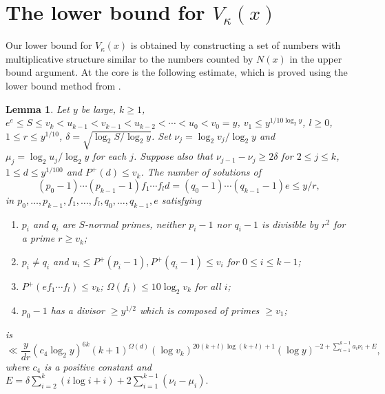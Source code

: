 \documentclass[11pt]{amsart}
\theoremstyle{remark}
\theoremstyle{plain}
\newtheorem{lem}{Lemma}[section]
\numberwithin{equation}{section}
\newcommand{\be}{\begin{equation}}
\newcommand{\ee}{\end{equation}}
\newcommand{\del}{\ensuremath{\delta}}
\renewcommand{\(}{\left(}
\renewcommand{\)}{\right)}
\renewcommand{\le}{\leqslant}
\renewcommand{\ge}{\geqslant}
\begin{document}
%
%
\section{The lower bound for $V_\kappa(x)$}
%
%
%




Our lower bound for $V_\kappa(x)$ is obtained by constructing a set of numbers
with multiplicative structure similar to the numbers counted by $N(x)$ in
the upper bound argument.  At the core is the following estimate, which
is proved using the lower bound method from \cite{MP}.

\begin{lem}\label{prodpiqi}
Let $y$ be large, $k\ge 1$, 
$e^e \le S \le v_k < u_{k-1} < v_{k-1} < 
u_{k-2} < \cdots < u_0 < v_0=y$, $v_1 \le y^{1/10\log_2 y}$, 
$l\ge 0$,  $1\le r\le y^{1/10}$,
$\del=\sqrt{\log_2 S/\log_2 y}$.  Set $\nu_j=\log_2 v_j/\log_2 y$ 
and $\mu_j=\log_2 u_j/\log_2 y$ for each $j$.
Suppose also that $\nu_{j-1}-\nu_j \ge 2\del$ for $2\le j\le k$,
$1\le d\le y^{1/100}$ and $P^+(d)\le v_k$.
The number of solutions of
\be\label{piqi}
(p_0-1)\cdots (p_{k-1}-1)f_1\cdots f_{l}d = (q_0-1)\cdots (q_{k-1}-1)e \le y/r,
\ee
in $p_0,\ldots,p_{k-1},f_1,\ldots,f_l,q_0,\ldots,q_{k-1},e$ satisfying
\begin{enumerate}
\item $p_i$ and $q_i$ are $S$-normal primes,
neither $p_i-1$ nor $q_i-1$ is divisible by $r^2$ for a prime $r\ge v_k$;
\item $p_i\ne q_i$ and $u_i\le P^+(p_i-1), P^+(q_i-1) \le v_i$ for 
$0\le i\le k-1$; %
\item $P^+(ef_1\cdots f_{l})\le v_k$; $\Omega(f_i)\le 10\log_2 v_k$ for all $i$; %
\item $p_0-1$ has a divisor $\ge y^{1/2}$ which is composed of primes $\ge v_1$;
\end{enumerate}
is
$$
\ll \frac{y}{dr} (c_4\log_2 y)^{6k} (k+1)^{\Omega(d)} 
(\log v_k)^{20(k+l)\log(k+l)+1}
(\log y)^{-2+\sum_{i=1}^{k-1} a_i \nu_i + E},
$$
where $c_4$ is a positive constant and
$E=\del \sum_{i=2}^k (i\log i+i) + 2 \sum_{i=1}^{k-1} (\nu_i-\mu_i).$
\end{lem}
\end{document}
